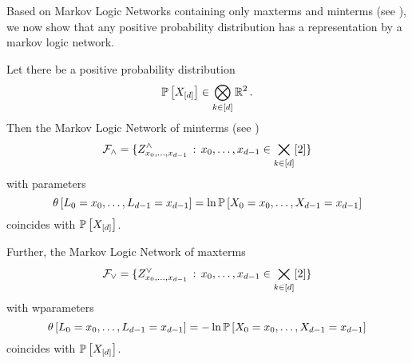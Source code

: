 \label{sec:MLNMaxMintermRep}

Based on Markov Logic Networks containing only maxterms and minterms (see ), we now show that any positive probability distribution has a representation by a markov logic network.

\begin{theorem}\label{the:maximalClausesRepresentation}\label{the:mintermExpressivityMLN}
	Let there be a positive probability distribution
		 \[ \mathbb{P}\left[X_{[d]}\right] \in \bigotimes_{k\in[d]}\mathbb{R}^2 \, . \]
	Then the Markov Logic Network of minterms (see )
		\[ \mathcal{F}_{\land} = \{Z^{\land}_{{x_{0},\ldots,x_{d-1}}} \, : \, {x_{0},\ldots,x_{d-1}}\in\bigtimes_{k\in[d]}[2] \}\]
	with parameters %
		\[ \canparamat{\selvariableof{0}=\catindexof{0},\ldots,\selvariableof{\atomorder-1}=\catindexof{\atomorder-1}}%
		= \ln \probat{\indexedcatvariables} \]
	coincides with $\mathbb{P}\left[X_{[d]}\right]$.

	Further, the Markov Logic Network of maxterms
		\[ \mathcal{F}_{\lor} = \{Z^{\lor}_{{x_{0},\ldots,x_{d-1}}} \, : \, {x_{0},\ldots,x_{d-1}}\in\bigtimes_{k\in[d]}[2] \}\]
	with wparameters
		\[ \canparamat{\selvariableof{0}=\catindexof{0},\ldots,\selvariableof{\atomorder-1}=\catindexof{\atomorder-1}} %
		= - \ln\probat{\indexedcatvariables} \]
	coincides with $\mathbb{P}\left[X_{[d]}\right]$.
\end{theorem}
